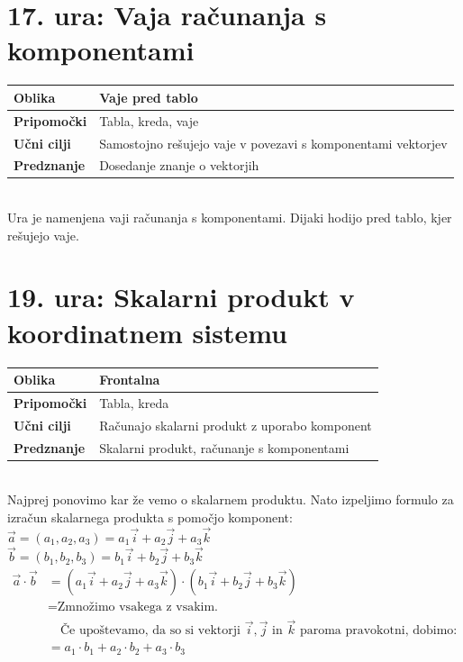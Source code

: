 \documentclass[a4paper,11pt]{article}
\begin{document}
\section{17. ura: Vaja računanja s komponentami}
\begin{tabularx}{\textwidth}{|>{\bfseries\RaggedRight}p{2.7cm}|X|}
\hline
Oblika & Vaje pred tablo\\ \hline
Pripomočki & Tabla, kreda, vaje \\ \hline
Učni cilji & Samostojno rešujejo vaje v povezavi s komponentami vektorjev \\ \hline
Predznanje & Dosedanje znanje o vektorjih \\ \hline

\end{tabularx}
\\

Ura je namenjena vaji računanja s komponentami. Dijaki hodijo pred tablo, kjer rešujejo vaje.

\newpage
\section{19. ura: Skalarni produkt v koordinatnem sistemu}
\begin{tabularx}{\textwidth}{|>{\bfseries\RaggedRight}p{2.7cm}|X|}
\hline
Oblika & Frontalna \\ \hline
Pripomočki & Tabla, kreda \\ \hline
Učni cilji & Računajo skalarni produkt z uporabo komponent \\ \hline
Predznanje &  Skalarni produkt, računanje s komponentami\\ \hline

\end{tabularx}
\\

Najprej ponovimo kar že vemo o skalarnem produktu. Nato izpeljimo formulo za izračun skalarnega produkta s pomočjo komponent:\\

\noindent $\vec{a}=(a_1, a_2, a_3)= a_1\vec{i}+a_2\vec{j}+a_3\vec{k}$\\
$\vec{b}=(b_1, b_2,b_3)= b_1\vec{i}+b_2\vec{j}+b_3\vec{k}$\\
\begin{align*}
    \vec{a}\cdot\vec{b}
    &=(a_1\vec{i}+a_2\vec{j}+a_3\vec{k})\cdot(b_1\vec{i}+b_2\vec{j}+b_3\vec{k})\\
    &= \text{Zmnožimo vsakega z vsakim.}\\
    &\quad \text{Če upoštevamo, da so si vektorji $\vec{i},\vec{j}$ in $\vec{k}$ paroma pravokotni, dobimo:}\\
    &=a_1\cdot b_1 + a_2\cdot b_2+a_3\cdot b_3
\end{align*}
\end{document}
